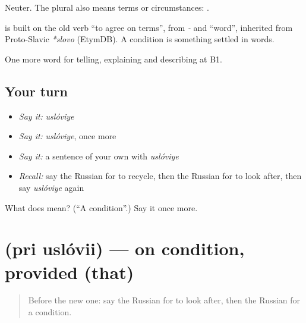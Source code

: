 Neuter. The plural \emph{} also means terms or circumstances: \emph{ }.

\begin{cousinweb}
\textbf{} is built on the old verb \emph{} \textquotedblleft{}to agree on terms\textquotedblright{}, from \emph{-} and \emph{} \textquotedblleft{}word\textquotedblright{}, inherited from Proto-Slavic \emph{*slovo} (EtymDB). A condition is something settled in words.
\end{cousinweb}

\begin{grammarlens}[title={What you've built}]
One more word for telling, explaining and describing at B1.
\end{grammarlens}

\subsection*{Your turn}
\begin{itemize}
\raggedright
  \item \emph{Say it:} \emph{uslóviye}
  \item \emph{Say it:} \emph{uslóviye}, once more
  \item \emph{Say it:} a sentence of your own with \emph{uslóviye}
  \item \emph{Recall:} say the Russian for to recycle, then the Russian for to look after, then say \emph{uslóviye} again
\end{itemize}

\begin{tcolorbox}[breakable,colback=teal!4,colframe=teal!35!black,title={Before you move on}]
What does  mean? (\textquotedblleft{}A condition\textquotedblright{}.) Say it once more.
\end{tcolorbox}
\section[\texorpdfstring{\ru{при} \ru{условии} (pri uslóvii)}{при условии (pri uslóvii)}]{  (pri uslóvii) — on condition, provided (that)}

\label{lesson:RU-C370-pri-uslovii}



\begin{quote}
Before the new one: say the Russian for to look after, then the Russian for a condition.
\end{quote}

